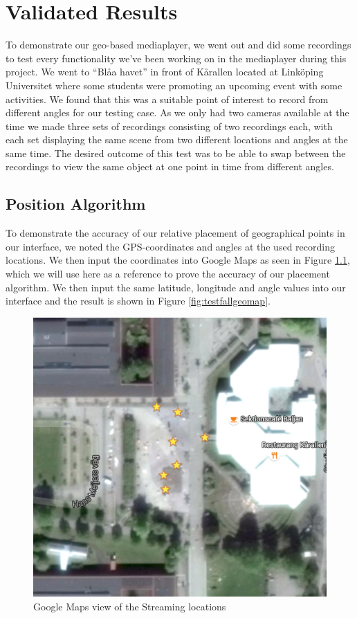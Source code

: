 \chapter{Validated Results}
\label{cha:results}

To demonstrate our geo-based mediaplayer, we went out and did some recordings to test every functionality we’ve been working on in the mediaplayer during this project. We went to “Blåa havet” in front of Kårallen located at Linköping Universitet where some students were promoting an upcoming event with some activities. We found that this was a suitable point of interest to record from different angles for our testing case. As we only had two cameras available at the time we made three sets of recordings consisting of two recordings each, with each set displaying the same scene from two different locations and angles at the same time. The desired outcome of this test was to be able to swap between the recordings to view the same object at one point in time from different angles.

\section{Position Algorithm}
\label{sec:positionalgorithm}

To demonstrate the accuracy of our relative placement of geographical points in our interface, we noted the GPS-coordinates and angles at the used recording locations. We then input the coordinates into Google Maps as seen in Figure \ref{fig:googlemaps}, which we will use here as a reference to prove the accuracy of our placement algorithm. We then input the same latitude, longitude and angle values into our interface and the result is shown in Figure \ref{fig:testfallgeomap}.


\begin{figure}[ht!]
\begin{center}
	\includegraphics[scale=0.64]{Google_Maps.png}
	\caption{Google Maps view of the Streaming locations}
	\label{fig:googlemaps}
\end{center}
\end{figure}

